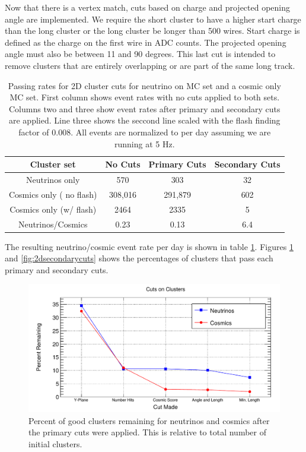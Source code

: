 Now that there is a vertex match, cuts based on charge and projected opening angle are implemented. We require the short cluster to have a higher start charge than the long cluster or the long cluster be longer than 500 wires. Start charge is defined as the charge on the first wire in ADC counts. The projected opening angle must also be between 11 and 90 degrees. This last cut is intended to remove clusters that are entirely overlapping or are part of the same long track. 
\begin{table}
\begin{center}
\begin{tabular}{c c c c}
\hline
Cluster set & No Cuts & Primary Cuts & Secondary Cuts \\
\hline
Neutrinos only & 570 & 303 & 32 \\
Cosmics only ( no flash) & 308,016 & 291,879 & 602 \\
Cosmics only (w/ flash) & 2464 & 2335 & 5 \\
\hline
Neutrinos/Cosmics & 0.23 & 0.13 & 6.4 \\
\end{tabular}
\caption{Passing rates for 2D cluster cuts for neutrino on MC set and a cosmic only MC set. First column shows event rates with no cuts applied to both sets. Columns two and three show event rates after primary and secondary cuts are applied. Line three shows the seccond line scaled with the flash finding factor of 0.008. All events are normalized to per day assuming we are running at 5 Hz.}
\label{table:eventrate}
\end{center}
\end{table}
The resulting neutrino/cosmic event rate per day is shown in table \ref{table:eventrate}. Figures \ref{fig:2dprimarycut} and \ref{fig:2dsecondarycuts} shows the percentages of clusters that pass each primary and secondary cuts.     

\begin{figure}[htp!]
\centering
\includegraphics[width=\textwidth]{figs/2dprimarycut.png}
\caption{Percent of good clusters remaining for neutrinos and cosmics after the primary cuts were applied. This is relative to total number of initial clusters.}
\label{fig:2dprimarycut}
\end{figure}

